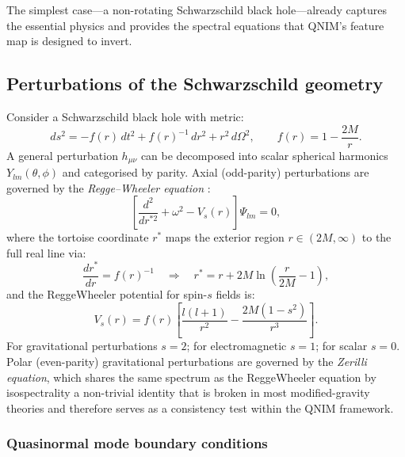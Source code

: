 \documentclass[11pt,a4paper, english]{book}
\theoremstyle{plain}
\theoremstyle{definition}
\numberwithin{equation}{chapter}
\numberwithin{figure}{chapter}
\numberwithin{table}{chapter}
\begin{document}
The simplest case—a non-rotating Schwarzschild black hole—already captures
the essential physics and provides the spectral equations that QNIM's
feature map is designed to invert.

\subsection{Perturbations of the Schwarzschild geometry}
\label{subsec:rw-equation}

Consider a Schwarzschild black hole with metric:
\begin{equation}
  \label{eq:schwarzschild}
  ds^2 = -f(r)\,dt^2 + f(r)^{-1}\,dr^2 + r^2\,d\Omega^2,
  \qquad f(r) = 1 - \frac{2M}{r}.
\end{equation}
A general perturbation $h_{\mu\nu}$ can be decomposed into scalar spherical
harmonics $Y_{lm}(\theta,\phi)$ and categorised by parity.  Axial (odd-parity)
perturbations are governed by the \emph{Regge--Wheeler equation}
\cite{Regge_1957}:
\begin{equation}
  \label{eq:regge_wheeler}
  \left[ \frac{d^2}{dr^{*2}} + \omega^2 - V_s(r) \right] \Psi_{lm} = 0,
\end{equation}
where the tortoise coordinate $r^*$ maps the exterior region $r \in (2M,\infty)$
to the full real line via:
\begin{equation}
  \label{eq:tortoise}
  \frac{dr^*}{dr} = f(r)^{-1}
  \quad\Longrightarrow\quad
  r^* = r + 2M\ln\!\left(\frac{r}{2M}-1\right),
\end{equation}
and the ReggeWheeler potential for spin-$s$ fields is:
\begin{equation}
  \label{eq:rw_potential}
  V_s(r) = f(r)\left[\frac{l(l+1)}{r^2} - \frac{2M(1-s^2)}{r^3}\right].
\end{equation}
For gravitational perturbations $s=2$; for electromagnetic $s=1$; for scalar
$s=0$.  Polar (even-parity) gravitational perturbations are governed by the
\emph{Zerilli equation}, which shares the same spectrum as the ReggeWheeler
equation by isospectrality  a non-trivial identity that is broken in most
modified-gravity theories and therefore serves as a consistency test within
the QNIM framework.

\subsubsection{Quasinormal mode boundary conditions}
\end{document}
